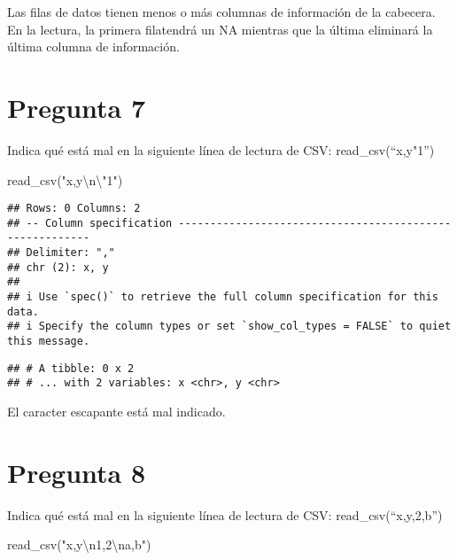 \documentclass[
]{article}
\newenvironment{Shaded}{\begin{snugshade}}{\end{snugshade}}
\newcommand{\FunctionTok}[1]{\textcolor[rgb]{0.00,0.00,0.00}{#1}}
\newcommand{\NormalTok}[1]{#1}
\newcommand{\SpecialCharTok}[1]{\textcolor[rgb]{0.00,0.00,0.00}{#1}}
\newcommand{\StringTok}[1]{\textcolor[rgb]{0.31,0.60,0.02}{#1}}
\begin{document}
Las filas de datos tienen menos o más columnas de información de la
cabecera. En la lectura, la primera filatendrá un NA mientras que la
última eliminará la última columna de información.

\hypertarget{pregunta-7}{%
\section{Pregunta 7}\label{pregunta-7}}

Indica qué está mal en la siguiente línea de lectura de CSV:
read\_csv(``x,y\n"1'')

\begin{Shaded}
\begin{Highlighting}[]
\FunctionTok{read\_csv}\NormalTok{(}\StringTok{"x,y}\SpecialCharTok{\textbackslash{}n\textbackslash{}"}\StringTok{1"}\NormalTok{)}
\end{Highlighting}
\end{Shaded}

\begin{verbatim}
## Rows: 0 Columns: 2
## -- Column specification --------------------------------------------------------
## Delimiter: ","
## chr (2): x, y
## 
## i Use `spec()` to retrieve the full column specification for this data.
## i Specify the column types or set `show_col_types = FALSE` to quiet this message.
\end{verbatim}

\begin{verbatim}
## # A tibble: 0 x 2
## # ... with 2 variables: x <chr>, y <chr>
\end{verbatim}

El caracter escapante está mal indicado.

\hypertarget{pregunta-8}{%
\section{Pregunta 8}\label{pregunta-8}}

Indica qué está mal en la siguiente línea de lectura de CSV:
read\_csv(``x,y,2\na,b'')

\begin{Shaded}
\begin{Highlighting}[]
\FunctionTok{read\_csv}\NormalTok{(}\StringTok{"x,y}\SpecialCharTok{\textbackslash{}n}\StringTok{1,2}\SpecialCharTok{\textbackslash{}n}\StringTok{a,b"}\NormalTok{)}
\end{Highlighting}
\end{Shaded}
\end{document}
